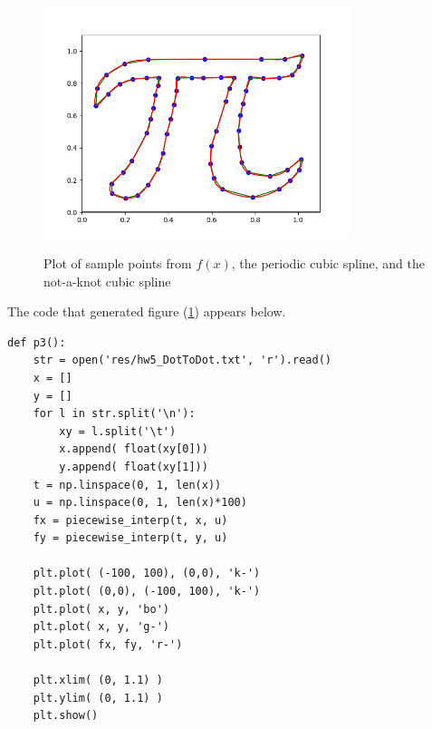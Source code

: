 \documentclass[12pt]{article}
\begin{document}
	\begin{figure}[H]
		\caption{Plot of sample points from $f(x)$, the periodic cubic spline, and the not-a-knot cubic spline}
		\includegraphics[width=0.80\textwidth]{hw5_p3_fig1}
		\label{hw5_p3_fig1}
		\centering
	\end{figure}
	
	The code that generated figure (\ref{hw5_p3_fig1}) appears below.
	
	\begin{lstlisting}
def p3():
	str = open('res/hw5_DotToDot.txt', 'r').read()
	x = []
	y = []
	for l in str.split('\n'):
		xy = l.split('\t')
		x.append( float(xy[0]))
		y.append( float(xy[1]))
	t = np.linspace(0, 1, len(x))
	u = np.linspace(0, 1, len(x)*100)
	fx = piecewise_interp(t, x, u)
	fy = piecewise_interp(t, y, u)
	
	plt.plot( (-100, 100), (0,0), 'k-')
	plt.plot( (0,0), (-100, 100), 'k-')
	plt.plot( x, y, 'bo')
	plt.plot( x, y, 'g-')
	plt.plot( fx, fy, 'r-')
	
	plt.xlim( (0, 1.1) )
	plt.ylim( (0, 1.1) )
	plt.show()
	\end{lstlisting}
	
	
\end{document}
